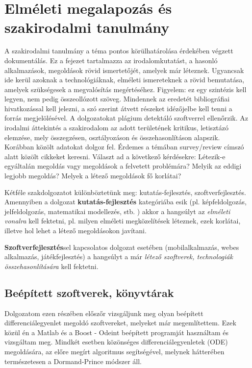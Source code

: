 \chapter{Elméleti megalapozás és szakirodalmi tanulmány} \label{fejezet3}

A szakirodalmi tanulmány a téma pontos körülhatárolása érdekében végzett dokumentálás. Ez a fejezet tartalmazza az irodalomkutatást, a hasonló alkalmazások, megoldások rövid ismertetőjét, amelyek már léteznek. Ugyancsak ide kerül azoknak a technológiáknak, elméleti ismereteknek a rövid bemutatása, amelyek szükségesek a megvalósítás megértéséhez.
Figyelem: ez egy szintézis kell legyen, nem pedig összeollózott szöveg. Mindennek az eredetét bibliográfiai hivatkozással kell jelezni, a szó szerint átvett részeket idézőjelbe kell tenni a forrás megjelölésével. A dolgozatokat plágium detektáló szoftverrel ellenőrzik.
Az irodalmi áttekintés a szakirodalom az adott területének kritikus, letisztázó elemzése, mely összegzésen, osztályozáson és összehasonlításon alapszik. Korábban közölt adatokat dolgoz fel. Érdemes a témában survey/review címszó alatt közölt cikkeket keresni. Választ ad a következő kérdésekre: 
Létezik-e egyáltalán megoldás vagy megoldások a felvetett problémára? Melyik az eddigi  legjobb megoldás?
Melyek a létező megoldások fő korlátai? 




Kétféle szakdolgozatot különböztetünk meg: kutatás-fejlesztés, szoftverfejlesztés.
Amennyiben a dolgozat \textbf{kutatás-fejlesztés} kategóriába esik (pl. képfeldolgozás, jelfeldolgozás, matematikai modellezés, stb. ) akkor a hangsúlyt az \textit{elméleti vonalra} kell fektetni, pl. milyen elméleti megközelítések léteznek, ezek korlátai, illetve hol lehet a létező megoldásokon javítani.

\textbf{Szoftverfejlesztés}sel kapcsolatos dolgozat esetében (mobilalkalmazás, webes alkalmazás, játékfejlesztés) a hangsúlyt a már \textit{létező szoftverek, technologiák összehasonlítására} kell fektetni. 




\section {Beépített szoftverek, könyvtárak}

Dolgozatom ezen részében előszőr vizsgáljunk meg olyan beépített differenciálegyenlet megoldó szoftvereket, melyeket már megemlítettem. Ezek közül én a Matlab és a Boost - Odeint beépített programját használtam és vizsgáltam meg. Mindkét esetben közönséges differenciálegyenletek (ODE) megoldására, az előre megírt algoritmus segítségével, melynek hátterében természetesen a Dormand-Prince módszer áll.


